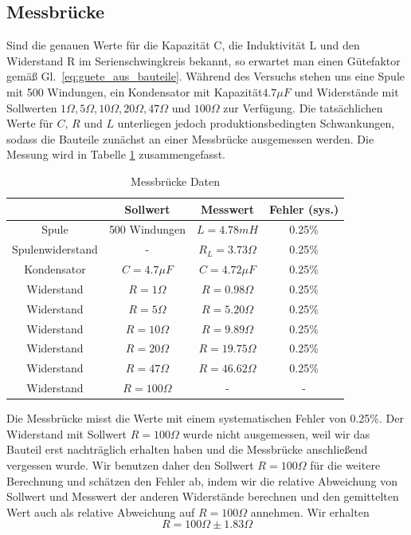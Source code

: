 \documentclass[12pt,a4paper]{article}
\begin{document}
\subsection{Messbrücke}
Sind die genauen Werte für die Kapazität C, die Induktivität L und den Widerstand R im Serienschwingkreis bekannt, so erwartet man einen Gütefaktor gemäß Gl.~\eqref{eq:guete_aus_bauteile}. Während des Versuchs stehen uns eine Spule mit 500 Windungen, ein Kondensator mit Kapazität$4.7\mu F$ und Widerstände mit Sollwerten $1\Omega,5\Omega,10\Omega,20\Omega,47\Omega$ und $100\Omega$ zur Verfügung. Die tatsächlichen Werte für $C$, $R$ und $L$ unterliegen jedoch produktionsbedingten Schwankungen, sodass die Bauteile zunächst an einer Messbrücke ausgemessen werden. Die Messung wird in Tabelle \ref{table:Messbruecke} zusammengefasst.
\begin{table}[H]
	\centering
	\begin{tabular}{|c|c|c|c|}
		\hline
		&Sollwert&Messwert&Fehler (sys.)\\
		\hline
		Spule&500 Windungen&$L=4.78mH$&0.25\%\\
		Spulenwiderstand&-&$R_L=3.73\Omega$&0.25\%\\
		Kondensator&$C=4.7\mu F$&$C=4.72\mu F$&0.25\%\\
		Widerstand&$R=1\Omega$&$R=0.98\Omega$&0.25\%\\
		Widerstand&$R=5\Omega$&$R=5.20\Omega$&0.25\%\\		
		Widerstand&$R=10\Omega$&$R=9.89\Omega$&0.25\%\\		
		Widerstand&$R=20\Omega$&$R=19.75\Omega$&0.25\%\\
		Widerstand&$R=47\Omega$&$R=46.62\Omega$&0.25\%\\
		Widerstand&$R=100\Omega$&-&-\\
		\hline
	\end{tabular}
	\caption{Messbrücke Daten}
	\label{table:Messbruecke}
\end{table}
Die Messbrücke misst die Werte mit einem systematischen Fehler von 0.25\%. Der Widerstand mit Sollwert $R=100\Omega$ wurde nicht ausgemessen, weil wir das Bauteil erst nachträglich erhalten haben und die Messbrücke anschließend vergessen wurde. Wir benutzen daher den Sollwert $R=100\Omega$ für die weitere Berechnung und schätzen den Fehler ab, indem wir die relative Abweichung von Sollwert und Messwert der anderen Widerstände berechnen und den gemittelten Wert auch als relative Abweichung auf $R=100\Omega$ annehmen. Wir erhalten
\begin{equation}
R=100\Omega\pm 1.83\Omega
\end{equation}
\end{document}
